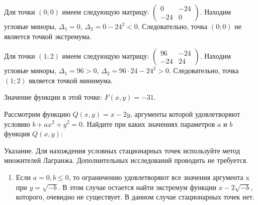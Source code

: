 \documentclass[addpoints, answers]{exam} %
\begin{document}
\begin{questions}
\begin{solution}
Для точки  $(0;0)$ имеем следующую матрицу:  
$\begin{pmatrix}
0 & -24 \\
-24 & 0
\end{pmatrix}$. 
Находим угловые миноры, $\Delta_1=0$, $\Delta_2=0-24^2<0$. Следовательно, точка $(0;0)$  не является точкой экстремума.


Для точки $(1;2)$  имеем следующую матрицу:
$\begin{pmatrix}
96 & -24 \\
-24 & 24
\end{pmatrix}.$  
Находим угловые миноры, $\Delta_1=96>0$, $\Delta_2=96\cdot 24 -24^2>0$.  Следовательно, точка $(1;2)$  является точкой минимума.

Значение функции в этой точке: $F(x,y)=-31$.
\end{solution}

\question Рассмотрим функцию $Q(x,y)=x-2y$, аргументы которой удовлетворяют условию $b+ax^2+y^2=0$.
Найдите при каких значениях параметров $a$ и $b$  функция $Q(x,y)$:


Указание. Для нахождения условных стационарных точек используйте метод множителей Лагранжа. Дополнительных исследований проводить не требуется. 


\begin{solution}

\begin{enumerate}
\item Если $a=0,b\le 0$, то ограничению удовлетворяют все значения аргумента x при $y=\sqrt{-b} $. В этом случае остается найти экстремум функции $x-2\sqrt{-b} $, которого, очевидно не существует. В данном случае стационарных точек нет. 


\end{enumerate}
\end{solution}
\end{questions}
\end{document}
